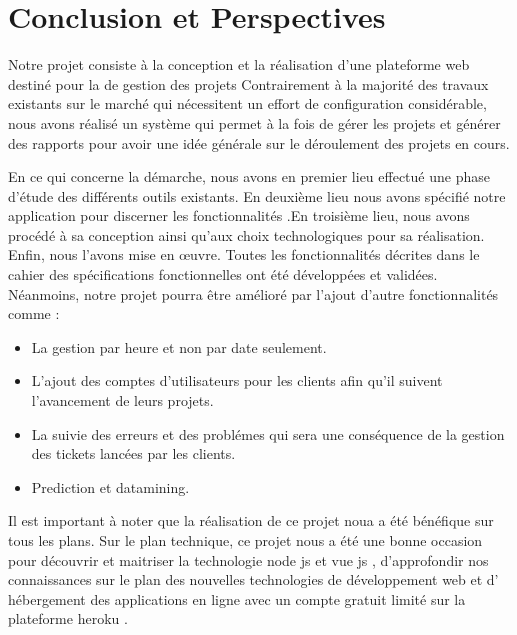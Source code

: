 
\chapter*{Conclusion et Perspectives}
Notre projet  consiste \`{a} la conception et la r\'{e}alisation d'une plateforme web destin\'{e} pour la de gestion des projets
Contrairement \`{a} la majorit\'{e} des travaux existants sur le march\'{e} qui n\'{e}cessitent un effort de configuration consid\'{e}rable, nous avons r\'{e}alis\'{e} un syst\`{e}me qui permet \`{a} la fois de g\'{e}rer les projets et g\'{e}n\'{e}rer des rapports pour avoir une id\'{e}e g\'{e}n\'{e}rale sur le d\'{e}roulement des projets en cours.

En ce qui concerne la d\'{e}marche, nous avons en premier lieu effectu\'{e} une phase d'\'{e}tude des diff\'{e}rents outils existants. En deuxi\`{e}me lieu nous avons sp\'{e}cifi\'{e} notre application pour discerner les fonctionnalit\'{e}s .En troisi\`{e}me lieu, nous avons proc\'{e}d\'{e} \`{a} sa conception ainsi qu'aux choix technologiques pour sa r\'{e}alisation. Enfin, nous l'avons mise en \oe{}uvre.
Toutes les fonctionnalit\'{e}s d\'{e}crites dans le cahier des sp\'{e}cifications fonctionnelles ont \'{e}t\'{e} d\'{e}velopp\'{e}es et valid\'{e}es. N\'{e}anmoins, notre projet pourra \^{e}tre am\'{e}lior\'{e} par l'ajout d'autre
fonctionnalit\'{e}s comme :

\begin{itemize}
\item{ La gestion par heure et non par date seulement.}
\item{ L'ajout des comptes d'utilisateurs pour les clients afin qu'il suivent l'avancement de leurs projets.}
\item{ La suivie des erreurs et des probl\'{e}mes qui sera une  cons\'{e}quence de la gestion des tickets lanc\'{e}es par les clients.  }
\item{ Prediction et datamining. }
\end{itemize}


\newpage

Il est important \`{a} noter que la r\'{e}alisation de ce projet noua a \'{e}t\'{e} b\'{e}n\'{e}fique sur tous les plans.
Sur le plan technique, ce projet nous a \'{e}t\'{e} une bonne occasion pour d\'{e}couvrir et maitriser la technologie node js et vue js ,
d'approfondir nos connaissances sur le plan des nouvelles technologies de d\'{e}veloppement web et
d' h\'{e}bergement des applications en ligne avec un compte gratuit limit\'{e} sur la plateforme \guillemotleft{} heroku \guillemotright{}.

